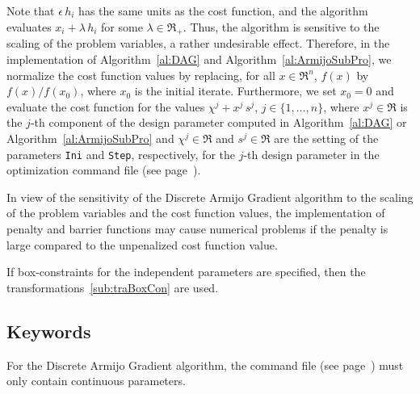 Note that $\epsilon \, h_i$ has the same units as the cost function,
and the algorithm evaluates $x_i + \lambda \, h_i$ for some $\lambda \in \Re_+$.
Thus, the algorithm is sensitive to the scaling of the problem variables,
a rather undesirable effect.
Therefore, in the implementation of 
Algorithm~\ref{al:DAG} and Algorithm~\ref{al:ArmijoSubPro},
we normalize the cost function values by replacing, for all $x \in \Re^n$,
$f(x)$ by $f(x)/f(x_0)$, where $x_0$ is the initial iterate.
Furthermore, we set $x_0 = 0$ and evaluate the cost function for the values
$\chi^j + x^j \, s^j$, $j \in \{1, \ldots, n\}$, where
$x^j \in \Re$ is the $j$-th component of the design parameter computed in
Algorithm~\ref{al:DAG} or Algorithm~\ref{al:ArmijoSubPro} and
$\chi^j \in \Re$ and $s^j \in \Re$ are the setting of the parameters
\texttt{Ini} and \texttt{Step}, respectively, for
the $j$-th design parameter in the optimization command file 
(see page~\pageref{par:comFil}).

In view of the sensitivity of the Discrete Armijo Gradient algorithm
to the scaling of the problem variables and the cost function values,
the implementation of penalty and barrier functions may cause
numerical problems if the penalty is large compared to the unpenalized
cost function value.

If box-constraints for the independent parameters are specified,
then the transformations~\eqref{sub:traBoxCon} are used.

\subsection{Keywords}
For the Discrete Armijo Gradient algorithm, the command file (see page~\pageref{par:comFil}) must only contain continuous parameters.\\

